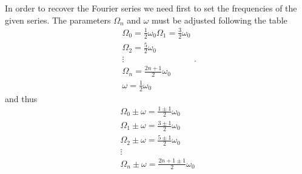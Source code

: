 \documentclass[aps,amssymb,amsmath,amsfonts,pra,superscriptaddress,onecolumn]{revtex4}
\begin{document}
In order to recover the Fourier series we need first to set the frequencies of the given series. The parameters $\Omega_n$ and $\omega$ must be adjusted following the table
\begin{equation}
    \begin{matrix}
    \Omega_0 = \frac{1}{2}\omega_0
    \Omega_1 = \frac{3}{2}\omega_0 \\
    \Omega_2 = \frac{5}{2}\omega_0 \\
    \vdots \\
    \Omega_n = \frac{2n + 1}{2}\omega_0 \\
    \omega = \frac{1}{2}\omega_0
    \end{matrix}.
\end{equation}
and thus
\begin{equation}
    \begin{matrix}
    \Omega_0 \pm \omega = \frac{1 \pm 1}{2}\omega_0 \\
    \Omega_1 \pm \omega = \frac{3 \pm 1}{2}\omega_0 \\
    \Omega_2 \pm \omega = \frac{5 \pm 1}{2}\omega_0 \\
    \vdots \\
    \Omega_n \pm \omega = \frac{2n + 1 \pm 1}{2}\omega_0 \\
    \end{matrix}
\end{equation}
\end{document}
